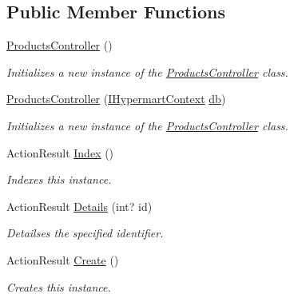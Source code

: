 \subsection*{Public Member Functions}
\begin{DoxyCompactItemize}
\item 
\hyperlink{class_open_1_1_g_i_1_1hypermart_1_1_controllers_1_1_products_controller_aa13f8209001ea23ae8bc01e98eed6326}{Products\+Controller} ()
\begin{DoxyCompactList}\small\item\em Initializes a new instance of the \hyperlink{class_open_1_1_g_i_1_1hypermart_1_1_controllers_1_1_products_controller}{Products\+Controller} class. \end{DoxyCompactList}\item 
\hyperlink{class_open_1_1_g_i_1_1hypermart_1_1_controllers_1_1_products_controller_a6a2c51b106907bf08ce7da150be7424b}{Products\+Controller} (\hyperlink{interface_open_1_1_g_i_1_1hypermart_1_1_d_a_l_1_1_i_hypermart_context}{I\+Hypermart\+Context} \hyperlink{class_open_1_1_g_i_1_1hypermart_1_1_controllers_1_1_products_controller_aec73a09108adc7af8384701886c5e53a}{db})
\begin{DoxyCompactList}\small\item\em Initializes a new instance of the \hyperlink{class_open_1_1_g_i_1_1hypermart_1_1_controllers_1_1_products_controller}{Products\+Controller} class. \end{DoxyCompactList}\item 
Action\+Result \hyperlink{class_open_1_1_g_i_1_1hypermart_1_1_controllers_1_1_products_controller_a244e974803aa1c0f91e8a4fcf0618a9d}{Index} ()
\begin{DoxyCompactList}\small\item\em Indexes this instance. \end{DoxyCompactList}\item 
Action\+Result \hyperlink{class_open_1_1_g_i_1_1hypermart_1_1_controllers_1_1_products_controller_a12f3659f36389715ec436c6a90bc0dc7}{Details} (int? id)
\begin{DoxyCompactList}\small\item\em Detailses the specified identifier. \end{DoxyCompactList}\item 
Action\+Result \hyperlink{class_open_1_1_g_i_1_1hypermart_1_1_controllers_1_1_products_controller_a1ead91e895aa356b20ba2840eafe0a99}{Create} ()
\begin{DoxyCompactList}\small\item\em Creates this instance. \end{DoxyCompactList}\item 

\end{DoxyCompactItemize}
